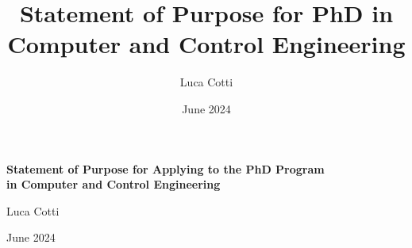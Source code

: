 \documentclass[a4paper,10pt]{article} %
\title{Statement of Purpose for PhD in Computer and Control Engineering}
\author{Luca Cotti}
\date{June 2024}
\begin{document}

\begin{titlepage}
    \begin{center}
        \Large{\textbf{Statement of Purpose for Applying to the PhD Program\\in Computer and Control Engineering}}\\

        \vspace{4mm}
    
        \large{Luca Cotti}\\

        \vspace{2mm}

        \normalsize{June 2024}\\
    \end{center}
\end{titlepage}


\end{document}
